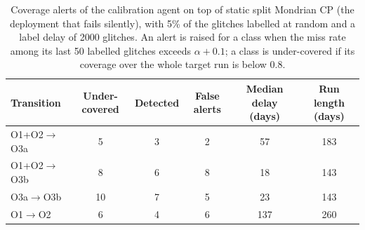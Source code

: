 \begin{table}[!htbp]
\caption{Coverage alerts of the calibration agent on top of static split Mondrian CP (the deployment that fails silently), with 5\%
of the glitches labelled at random and a label delay of 2000 glitches. An alert is raised for a class when the miss rate among its last
50 labelled glitches exceeds $\alpha+0.1$; a class is under-covered if its coverage over the whole target run is below 0.8.}\label{tab:e9alerts}
\centering\footnotesize\setlength{\tabcolsep}{4pt}
\begin{tabular}{lccccc}\toprule
Transition & Under-covered & Detected & False alerts & Median delay (days) & Run length (days)\\\midrule
O1+O2$\rightarrow$O3a & 5 & 3 & 2 & 57 & 183\\
O1+O2$\rightarrow$O3b & 8 & 6 & 8 & 18 & 143\\
O3a$\rightarrow$O3b & 10 & 7 & 5 & 23 & 143\\
O1$\rightarrow$O2 & 6 & 4 & 6 & 137 & 260\\
\bottomrule
\end{tabular}
\end{table}
